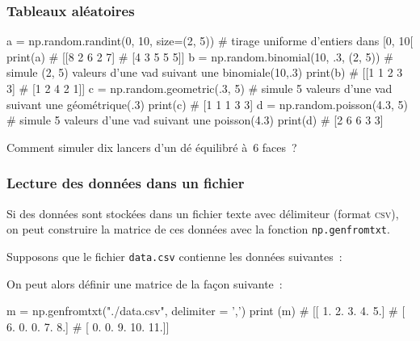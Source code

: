 \documentclass[10pt,fleqn]{article} %
\begin{document}
\subsubsection{Tableaux aléatoires}

\begin{python}
a = np.random.randint(0, 10, size=(2, 5)) # tirage uniforme d'entiers dans [0, 10[
print(a)
# [[8 2 6 2 7]
#  [4 3 5 5 5]]
b = np.random.binomial(10, .3, (2, 5)) # simule (2, 5) valeurs d'une vad suivant une binomiale(10,.3)
print(b)
# [[1 1 2 3 3]
#  [1 2 4 2 1]]
c = np.random.geometric(.3, 5) # simule 5 valeurs d'une vad suivant une géométrique(.3)
print(c)
# [1 1 1 3 3]
d = np.random.poisson(4.3, 5) # simule 5 valeurs d'une vad suivant une poisson(4.3)
print(d)
# [2 6 6 3 3]
\end{python}



  Comment simuler dix lancers d'un dé équilibré à~$6$ faces~?%

\subsubsection{Lecture des données dans un fichier}

Si des données sont stockées dans un fichier texte avec délimiteur (format
\textsc{csv}), on peut construire la matrice de ces données avec la
fonction \texttt{np.genfromtxt}. 

\begin{multicols}{2}
Supposons que le fichier \texttt{data.csv} contienne les données suivantes~:
\begin{center}
\begin{minipage}[t]{.3\textwidth}

\end{minipage}
\end{center}
On peut alors définir une matrice de la façon suivante~: 
\begin{python}
m = np.genfromtxt("./data.csv", delimiter = ',')
print (m)
# [[  1.   2.   3.   4.   5.]
#  [  6.   0.   0.   7.   8.]
#  [  0.   0.   9.  10.  11.]]  
\end{python}

\end{multicols}
\end{document}
